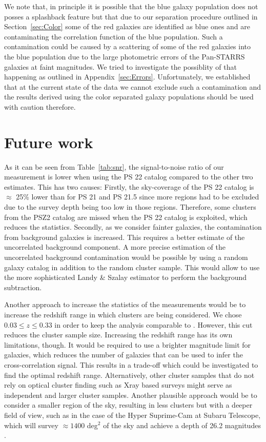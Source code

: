 \documentclass[iop, apjl, twocolappendix, numberedappendix]{emulateapj}
\begin{document}
We note that, in principle it is possible that the blue galaxy population does not posses
a splashback feature but that due to our separation procedure outlined in Section~\ref{sec:Color}
some of the red galaxies are identified as blue ones and are contaminating the correlation function
of the blue population. Such a contamination could be caused by a scattering of some of the red galaxies
into the blue population due to the large photometric errors of the Pan-STARRS galaxies at faint magnitudes.
We tried to investigate the possiblity of that happening as outlined in 
Appendix~\ref{sec:Errors}. Unfortunately, we established that at the current state of the data we cannot
exclude such a contamination and the results derived using the color separated galaxy populations
should be used with caution therefore.

\section{Future work}
\label{sec:Future}

As it can be seen from Table~\ref{tab:snr}, the signal-to-noise
ratio of our measurement is lower when using the PS 22 catalog
compared to the other two estimates. This has two causes: Firstly,
the sky-coverage of the PS 22 catalog is $\approx$ 25\% lower than
for PS 21 and PS 21.5 since more regions had to be excluded due to
the survey depth being too low in those regions. Therefore, some
clusters from the PSZ2 catalog are missed when the PS 22 catalog is
exploited, which reduces the statistics. Secondly, as we consider
fainter galaxies, the contamination from background galaxies is
increased. This requires a better estimate of the uncorrelated
background component. A more precise estimation of the uncorrelated
background contamination would be possible by using a random galaxy
catalog in addition to the random cluster sample. This would allow
to use the more sophisticated Landy \& Szalay estimator
\citep{landy1993bias} to perform the background subtraction.

Another approach to increase the statistics of the measurements would 
be to increase the redshift range in which clusters are being considered. 
We chose $0.03 \leq z \leq 0.33$ in order to keep the analysis comparable 
to \citet{more2016detection}. However, this cut reduces the cluster sample 
size. Increasing the redshift range has its own limitations, though. 
It would be required to use a brighter magnitude limit for galaxies, 
which reduces the number of galaxies that can be used to infer the 
cross-correlation signal. This results in a trade-off which could be investigated
to find the optimal redshift range. Alternatively, other cluster samples that do 
not rely on optical cluster finding such as Xray based surveys might 
serve as independent and larger cluster samples. 
Another plausible approach would be to consider a smaller region of
the sky, resulting in less clusters but with a deeper field of view,
such as in the case of the Hyper Suprime-Cam at Subaru Telescope,
which will survey $\approx 1400$ deg$^2$ of the sky and achieve a
depth of 26.2 magnitudes \citep{takada2010subaru}.
\end{document}
